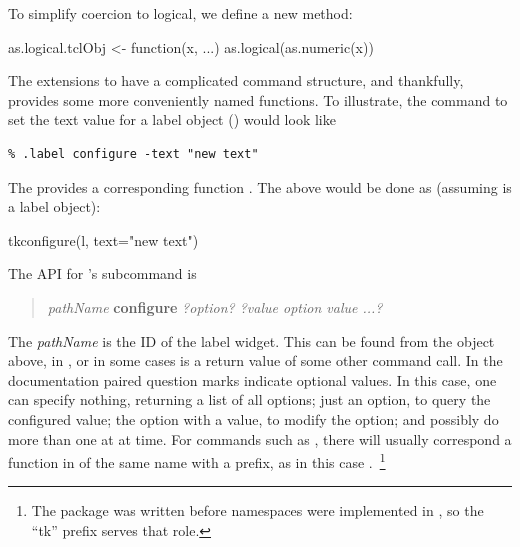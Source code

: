 To simplify coercion to logical, we define a new method:
\begin{Schunk}
\begin{Sinput}
 as.logical.tclObj <- function(x, ...) as.logical(as.numeric(x))
\end{Sinput}
\end{Schunk}


The \TK\/ extensions to \TCL\/ have a complicated command structure,
and thankfully,  provides some more conveniently named
functions. To illustrate, the \TCL\/ command to set the text value for
a label object () would look like
\begin{verbatim}
% .label configure -text "new text"
\end{verbatim}
The  provides a corresponding function
. The above would be done as (assuming  is a
label object):


\begin{Schunk}
\begin{Sinput}
 tkconfigure(l, text="new text")
\end{Sinput}
\end{Schunk}




The \TK\/ API for 's  subcommand is

\begin{quotation}
  \textit{pathName} \textbf{configure} \textit{?option? ?value option value ...?}
\end{quotation}

The \textit{pathName} is the ID of the label widget. This can be found
from the object  above, in , or in some cases is a
return value of some other command call.  In the \TK\/ documentation
paired question marks indicate optional values. In this case, one can
specify nothing, returning a list of all options; just an option, to
query the configured value; the option with a value, to modify the
option; and possibly do more than one at at time.  For commands such
as , there will usually correspond a function in
\R\/ of the same name with a  prefix, as in this case
.~\footnote{The package  was written before
namespaces were implemented in \R, so the ``tk'' prefix serves that role.}

